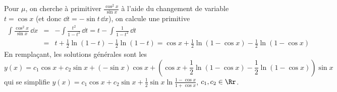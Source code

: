 {{Pour $\mu$, on cherche à primitiver 
$\frac{\cos^2x}{\sin x}$ à l'aide du changement de variable $t=\cos x$ (et donc $\dd t= -\sin t \,\dd x$), 
on calcule une primitive
\begin{eqnarray*}
\int \frac{\cos^2x}{\sin x}\,\dd x&=&-\int\frac{t^2}{1-t^2}\,\dd t=t-\int\frac{1}{1-t^2}\,\dd t\\ 
 &=&t+\frac{1}{2}\ln(1-t) -\frac{1}{2}\ln(1-t)= \cos x + \frac{1}{2}\ln(1-\cos x) - \frac{1}{2}\ln(1-\cos x)
\end{eqnarray*}
En remplaçant, les solutions générales sont les 
$$y(x)=c_1\cos x+c_2\sin x +  (-\sin x)\cos x+\left(\cos x + \frac{1}{2}\ln(1-\cos x) - \frac{1}{2}\ln(1-\cos x)\right)\sin x$$
qui se simplifie $y(x)=c_1\cos x+c_2\sin x + \frac{1}{2}\sin x\ln\frac{1-\cos x}{1+\cos x}$, $c_1,c_2\in\Rr$.
}
}
